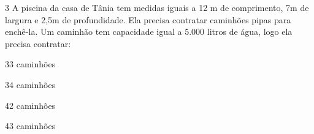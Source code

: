

\num{3} A piscina da casa de Tânia tem medidas iguais a 12 m de comprimento,
7m de largura e 2,5m de profundidade. Ela precisa contratar caminhões
pipas para enchê-la. Um caminhão tem capacidade igual a 5.000 litros de
água, logo ela precisa contratar:

\begin{escolha}[itemsep=0pt]
\item 33 caminhões
\item 34 caminhões
\item 42 caminhões
\item 43 caminhões
\end{escolha}



